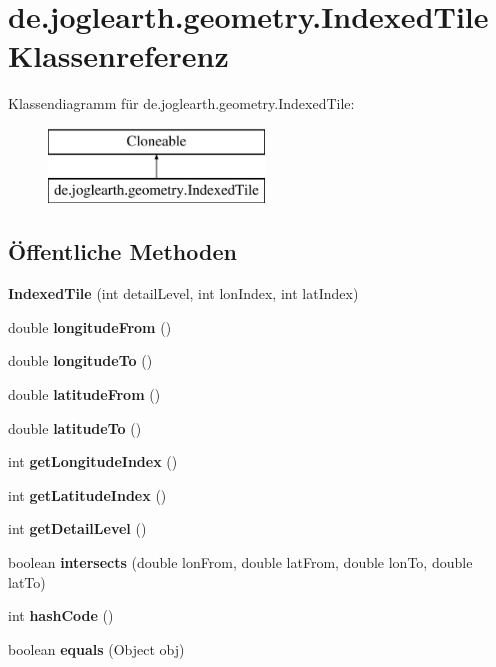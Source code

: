 \section{de.\-joglearth.\-geometry.\-Indexed\-Tile Klassenreferenz}
\label{classde_1_1joglearth_1_1geometry_1_1_indexed_tile}
Klassendiagramm für de.\-joglearth.\-geometry.\-Indexed\-Tile\-:\begin{figure}[H]
\begin{center}
\leavevmode
\includegraphics[height=2.000000cm]{classde_1_1joglearth_1_1geometry_1_1_indexed_tile}
\end{center}
\end{figure}
\subsection*{Öffentliche Methoden}
\begin{DoxyCompactItemize}
\item 
{\bf Indexed\-Tile} (int detail\-Level, int lon\-Index, int lat\-Index)
\item 
double {\bf longitude\-From} ()
\item 
double {\bf longitude\-To} ()
\item 
double {\bf latitude\-From} ()
\item 
double {\bf latitude\-To} ()
\item 
int {\bf get\-Longitude\-Index} ()
\item 
int {\bf get\-Latitude\-Index} ()
\item 
int {\bf get\-Detail\-Level} ()
\item 
boolean {\bfseries intersects} (double lon\-From, double lat\-From, double lon\-To, double lat\-To)\label{classde_1_1joglearth_1_1geometry_1_1_indexed_tile_af310357948d08d89003b5c6eb8d2db7c}

\item 
int {\bfseries hash\-Code} ()\label{classde_1_1joglearth_1_1geometry_1_1_indexed_tile_af5dde886686d3ae8d458442af6575d53}

\item 
boolean {\bfseries equals} (Object obj)\label{classde_1_1joglearth_1_1geometry_1_1_indexed_tile_ad1de27dfef28482a1b7a3da6e065d865}

\end{DoxyCompactItemize}
